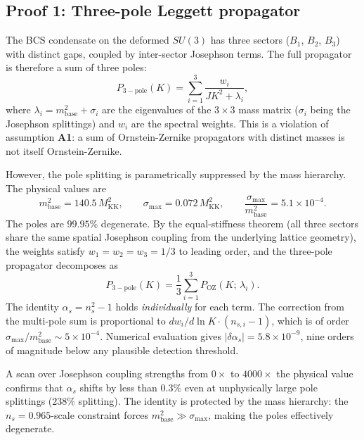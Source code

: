 \documentclass[12pt]{article}
\theoremstyle{definition}
\theoremstyle{remark}
\begin{document}
\subsection{Proof 1: Three-pole Leggett propagator}\label{sec:proof1}

The BCS condensate on the deformed $SU(3)$ has three sectors ($B_1$, $B_2$, $B_3$) with distinct gaps, coupled by inter-sector Josephson terms. The full propagator is therefore a sum of three poles:
\begin{equation}\label{eq:3pole}
  P_{\mathrm{3-pole}}(K) = \sum_{i=1}^{3} \frac{w_i}{J K^2 + \lambda_i},
\end{equation}
where $\lambda_i = m_{\mathrm{base}}^2 + \sigma_i$ are the eigenvalues of the $3\times 3$ mass matrix ($\sigma_i$ being the Josephson splittings) and $w_i$ are the spectral weights. This is a violation of assumption \textbf{A1}: a sum of Ornstein-Zernike propagators with distinct masses is not itself Ornstein-Zernike.

However, the pole splitting is parametrically suppressed by the mass hierarchy. The physical values are
\begin{equation}
  m_{\mathrm{base}}^2 = 140.5\,M_{\mathrm{KK}}^2, \qquad \sigma_{\mathrm{max}} = 0.072\,M_{\mathrm{KK}}^2, \qquad \frac{\sigma_{\mathrm{max}}}{m_{\mathrm{base}}^2} = 5.1 \times 10^{-4}.
\end{equation}
The poles are $99.95\%$ degenerate. By the equal-stiffness theorem (all three sectors share the same spatial Josephson coupling from the underlying lattice geometry), the weights satisfy $w_1 = w_2 = w_3 = 1/3$ to leading order, and the three-pole propagator decomposes as
\begin{equation}
  P_{\mathrm{3-pole}}(K) = \frac{1}{3}\sum_{i=1}^{3} P_{\mathrm{OZ}}(K;\,\lambda_i).
\end{equation}
The identity $\alpha_s = n_s^2 - 1$ holds \emph{individually} for each term. The correction from the multi-pole sum is proportional to $dw_i/d\ln K \cdot (n_{s,i} - 1)$, which is of order $\sigma_{\mathrm{max}}/m_{\mathrm{base}}^2 \sim 5 \times 10^{-4}$. Numerical evaluation gives $|\delta\alpha_s| = 5.8 \times 10^{-9}$, nine orders of magnitude below any plausible detection threshold.

A scan over Josephson coupling strengths from $0\times$ to $4000\times$ the physical value confirms that $\alpha_s$ shifts by less than $0.3\%$ even at unphysically large pole splittings ($238\%$ splitting). The identity is protected by the mass hierarchy: the $n_s = 0.965$-scale constraint forces $m_{\mathrm{base}}^2 \gg \sigma_{\mathrm{max}}$, making the poles effectively degenerate.
\end{document}
